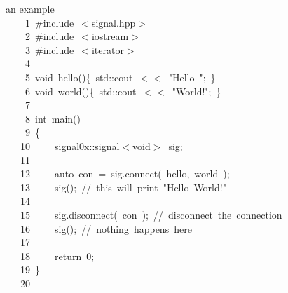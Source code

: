 \documentclass[9pt,onside,a4paper]{article}
\newcommand{\hlstd}[1]{\textcolor[rgb]{0.2,0,0.4}{#1}}
\newcommand{\hlnum}[1]{\textcolor[rgb]{0.2,0.73,0.02}{#1}}
\newcommand{\hlstr}[1]{\textcolor[rgb]{0.09,0.38,0.65}{#1}}
\newcommand{\hlslc}[1]{\textcolor[rgb]{0,0.4,0.2}{#1}}
\newcommand{\hlppc}[1]{\textcolor[rgb]{0.33,0.45,0.69}{#1}}
\newcommand{\hlopt}[1]{\textcolor[rgb]{0.33,0.33,0.33}{#1}}
\newcommand{\hllin}[1]{\textcolor[rgb]{0.6,0.6,0.6}{#1}}
\newcommand{\hlkwa}[1]{\textcolor[rgb]{1,0.19,0.19}{#1}}
\newcommand{\hlkwb}[1]{\textcolor[rgb]{0.96,0.55,0.14}{#1}}
\newcommand{\hlkwc}[1]{\textcolor[rgb]{0,0,1}{#1}}
\newcommand{\hlkwd}[1]{\textcolor[rgb]{0.82,0.11,0.93}{#1}}
\begin{document}
an example \\
\noindent
\ttfamily
\hlstd{}\hllin{\ \ \ \ 1\ }\hlppc{\#include\ $<$signal.hpp$>$}\\
\hllin{\ \ \ \ 2\ }\hlstd{}\hlppc{\#include\ $<$iostream$>$}\\
\hllin{\ \ \ \ 3\ }\hlstd{}\hlppc{\#include\ $<$iterator$>$}\\
\hllin{\ \ \ \ 4\ }\hlstd{}\\
\hllin{\ \ \ \ 5\ }\hlkwb{void\ }\hlstd{}\hlkwd{hello}\hlstd{}\hlopt{()\{\ }\hlstd{std}\hlopt{::}\hlstd{cout\ }\hlopt{$<$$<$\ }\hlstd{}\hlstr{"Hello\ "}\hlstd{}\hlopt{;\ \}}\\
\hllin{\ \ \ \ 6\ }\hlstd{}\hlkwb{void\ }\hlstd{}\hlkwd{world}\hlstd{}\hlopt{()\{\ }\hlstd{std}\hlopt{::}\hlstd{cout\ }\hlopt{$<$$<$\ }\hlstd{}\hlstr{"World!"}\hlstd{}\hlopt{;\ \}}\\
\hllin{\ \ \ \ 7\ }\hlstd{}\\
\hllin{\ \ \ \ 8\ }\hlkwb{int\ }\hlstd{}\hlkwd{main}\hlstd{}\hlopt{()}\\
\hllin{\ \ \ \ 9\ }\hlstd{}\hlopt{\{}\\
\hllin{\ \ \ 10\ }\hlstd{}\hlstd{\ \ \ \ }\hlstd{signal0x}\hlopt{::}\hlstd{signal}\hlopt{$<$}\hlstd{}\hlkwb{void}\hlstd{}\hlopt{$>$\ }\hlstd{sig}\hlopt{;}\\
\hllin{\ \ \ 11\ }\hlstd{\\
\hllin{\ \ \ 12\ }}\hlstd{\ \ \ \ }\hlstd{}\hlkwc{auto\ }\hlstd{con\ }\hlopt{=\ }\hlstd{sig}\hlopt{.}\hlstd{}\hlkwd{connect}\hlstd{}\hlopt{(\ }\hlstd{hello}\hlopt{,\ }\hlstd{world\ }\hlopt{);}\\
\hllin{\ \ \ 13\ }\hlstd{}\hlstd{\ \ \ \ }\hlstd{}\hlkwd{sig}\hlstd{}\hlopt{();\ }\hlstd{}\hlslc{//\ this\ will\ print\ "Hello\ World!"}\\
\hllin{\ \ \ 14\ }\hlstd{\\
\hllin{\ \ \ 15\ }}\hlstd{\ \ \ \ }\hlstd{sig}\hlopt{.}\hlstd{}\hlkwd{disconnect}\hlstd{}\hlopt{(\ }\hlstd{con\ }\hlopt{);\ }\hlstd{}\hlslc{//\ disconnect\ the\ connection}\\
\hllin{\ \ \ 16\ }\hlstd{}\hlstd{\ \ \ \ }\hlstd{}\hlkwd{sig}\hlstd{}\hlopt{();\ }\hlstd{}\hlslc{//\ nothing\ happens\ here}\\
\hllin{\ \ \ 17\ }\hlstd{}\hlstd{\ \ \ \ \ \ \ \ }\hlstd{\\
\hllin{\ \ \ 18\ }}\hlstd{\ \ \ \ }\hlstd{}\hlkwa{return\ }\hlstd{}\hlnum{0}\hlstd{}\hlopt{;}\\
\hllin{\ \ \ 19\ }\hlstd{}\hlopt{\}}\\
\hllin{\ \ \ 20\ }\hlstd{}\\
\mbox{}
\normalfont
\normalsize
\end{document}

